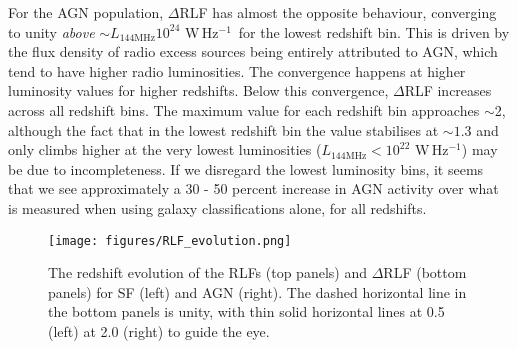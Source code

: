 \documentclass[usenatbib,fleqn,letters]{mnras}
\newcommand{\wphz}{$\,$W$\,$Hz$^{-1}$}
\newcommand{\llof}{$L_{\textrm{144MHz}}$}
\begin{document}
For the AGN population, $\Delta$RLF has almost the opposite behaviour, converging to unity \textit{above} $\sim$\llof $10^{24}\,$\wphz\ for the lowest redshift bin. This is driven by the flux density of radio excess sources being entirely attributed to AGN, which tend to have higher radio luminosities. The convergence happens at higher luminosity values for higher redshifts. Below this convergence, $\Delta$RLF increases across all redshift bins. The maximum value for each redshift bin approaches $\sim$2, although the fact that in the lowest redshift bin the value stabilises at $\sim1.3$ and only climbs higher at the very lowest luminosities (\llof $<10^{22}\,$\wphz ) may be due to incompleteness. If we disregard the lowest luminosity bins, it seems that we see approximately a 30 - 50 percent increase in AGN activity over what is measured when using galaxy classifications alone, for all redshifts. %


\begin{figure*}
    \centering
    \texttt{[image: figures/RLF\_evolution.png]}
    \caption{The redshift evolution of the RLFs (top panels) and $\Delta$RLF (bottom panels) for SF (left) and AGN (right). The dashed horizontal line in the bottom panels is unity, with thin solid horizontal lines at 0.5 (left) at 2.0 (right) to guide the eye.  }
    \label{fig:evolution}
\end{figure*}
\end{document}
